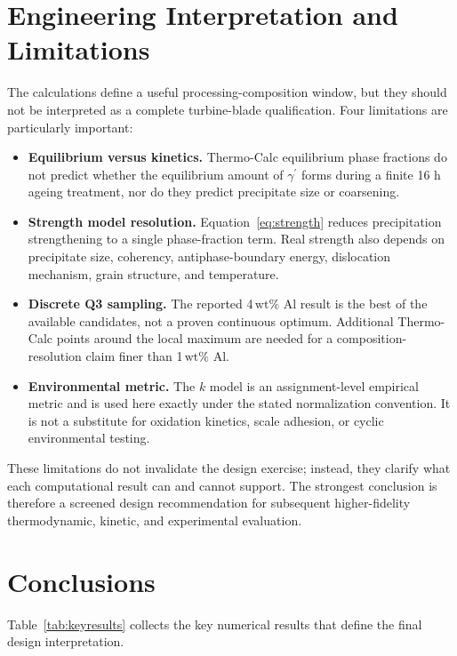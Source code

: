 \documentclass[11pt]{article}
\newcommand{\wtpct}{\ensuremath{\,\mathrm{wt}\%}}
\newcommand{\gprime}{\ensuremath{\gamma^{\prime}}}
\begin{document}
\section{Engineering Interpretation and Limitations}
The calculations define a useful processing-composition window, but they should not be interpreted as a complete turbine-blade qualification. Four limitations are particularly important:
\begin{itemize}
    \item \textbf{Equilibrium versus kinetics.} Thermo-Calc equilibrium phase fractions do not predict whether the equilibrium amount of \gprime{} forms during a finite 16 h ageing treatment, nor do they predict precipitate size or coarsening.
    \item \textbf{Strength model resolution.} Equation~\ref{eq:strength} reduces precipitation strengthening to a single phase-fraction term. Real strength also depends on precipitate size, coherency, antiphase-boundary energy, dislocation mechanism, grain structure, and temperature.
    \item \textbf{Discrete Q3 sampling.} The reported 4\wtpct{} Al result is the best of the available candidates, not a proven continuous optimum. Additional Thermo-Calc points around the local maximum are needed for a composition-resolution claim finer than 1\wtpct{} Al.
    \item \textbf{Environmental metric.} The $k$ model is an assignment-level empirical metric and is used here exactly under the stated normalization convention. It is not a substitute for oxidation kinetics, scale adhesion, or cyclic environmental testing.
\end{itemize}

These limitations do not invalidate the design exercise; instead, they clarify what each computational result can and cannot support. The strongest conclusion is therefore a screened design recommendation for subsequent higher-fidelity thermodynamic, kinetic, and experimental evaluation.

\section{Conclusions}
Table~\ref{tab:keyresults} collects the key numerical results that define the final design interpretation.
\end{document}
